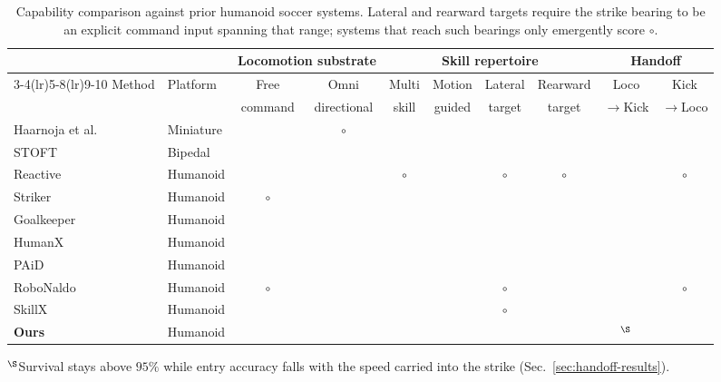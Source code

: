 \documentclass[letterpaper, 10 pt, conference]{ieeeconf}  %
\newcommand{\yes}{\textcolor{black!80}{\ding{51}}}
\newcommand{\no}{\textcolor{black!35}{\ding{55}}}
\newcommand{\partialmark}{\textcolor{black!60}{$\circ$}}
\begin{document}
\begin{table}[htbp]
\centering
\small
\setlength{\tabcolsep}{5pt}
\caption{Capability comparison against prior humanoid soccer systems.
Lateral and rearward targets require the strike bearing to be an explicit
command input spanning that range; systems that reach such bearings only
emergently score \partialmark.}
\label{tab:capabilities}
\begin{tabular}{llcccccccc}
\toprule
& & \multicolumn{2}{c}{\textbf{Locomotion substrate}} & \multicolumn{4}{c}{\textbf{Skill repertoire}} & \multicolumn{2}{c}{\textbf{Handoff}} \\
\cmidrule(lr){3-4}\cmidrule(lr){5-8}\cmidrule(lr){9-10}
Method & Platform & Free & Omni & Multi & Motion & Lateral & Rearward & Loco & Kick \\
 & & command & directional & skill & guided & target & target & $\to$Kick & $\to$Loco \\
\midrule
Haarnoja et al.~\cite{haarnoja2024soccer} & Miniature & \no & \partialmark & \no & \no & \no & \no & \yes & \yes \\
STOFT~\cite{stoft}            & Bipedal  & \no & \no & \yes & \no & \yes & \no & \yes & \yes \\
Reactive~\cite{reactive}      & Humanoid & \no & \no & \partialmark & \yes & \partialmark & \partialmark & \yes & \partialmark \\
Striker~\cite{striker}        & Humanoid & \partialmark & \no & \no & \no & \no & \no & \yes & \yes \\
Goalkeeper~\cite{goalkeeper}  & Humanoid & \no & \no & \yes & \yes & \no & \no & \no & \no \\
HumanX~\cite{humanx}          & Humanoid & \no & \no & \yes & \yes & \no & \no & \no & \no \\
PAiD~\cite{paid}              & Humanoid & \no & \no & \yes & \yes & \no & \no & \yes & \no \\
RoboNaldo~\cite{robonaldo}    & Humanoid & \partialmark & \no & \no & \yes & \partialmark & \no & \yes & \partialmark \\
SkillX~\cite{skillx}          & Humanoid & \no & \no & \yes & \yes & \partialmark & \no & \no & \no \\
\midrule
\textbf{Ours}                 & Humanoid & \yes & \yes & \yes & \yes & \yes & \yes & \yes$^{\S}$ & \yes \\
\bottomrule
\end{tabular}

{\footnotesize $^{\S}$Survival stays above $95\%$ while entry accuracy falls
with the speed carried into the strike (Sec.~\ref{sec:handoff-results}).}

\end{table}
\end{document}
